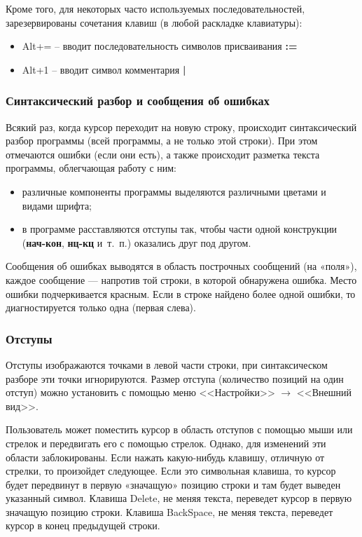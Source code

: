 Кроме того, для некоторых часто используемых последовательностей, зарезервированы сочетания клавиш (в любой раскладке клавиатуры):
\begin{itemize}
\item \textsf{Alt+=} -- вводит последовательность символов присваивания \textbf{\textsf{:=}}
\item \textsf{Alt+1} -- вводит символ комментария \textbf{\textsf{|}}
\end{itemize}
	
\subsubsection{Синтаксический разбор и сообщения об ошибках}

Всякий раз, когда курсор переходит на новую строку, происходит синтаксический разбор программы (всей программы, а не только этой строки). При этом отмечаются ошибки (если они есть), а также происходит разметка текста программы, облегчающая работу с ним:
\begin{itemize}
\item различные компоненты программы выделяются различными цветами и видами шрифта;
\item в программе расставляются отступы так, чтобы части одной конструкции (\textbf{\textsf{нач-кон}}, \textbf{\textsf{нц-кц}} и~т.~п.) оказались друг под другом.
\end{itemize}
	
Сообщения об ошибках выводятся в область построчных сообщений (на «поля»), каждое сообщение --- напротив той строки, в которой обнаружена ошибка. Место ошибки подчеркивается красным. Если в строке найдено более одной ошибки, то диагностируется только одна (первая слева).

\subsubsection{Отступы}

Отступы изображаются точками в левой части строки, при синтаксическом разборе эти точки игнорируются. Размер отступа (количество позиций на один отступ) можно установить с помощью меню <<Настройки>> $\to$ <<Внешний вид>>.

Пользователь может поместить курсор в область отступов с помощью мыши или стрелок и передвигать его с помощью стрелок. Однако, для изменений эти области заблокированы. Если нажать какую-нибудь клавишу, отличную от стрелки, то произойдет следующее. Если это символьная клавиша, то курсор будет передвинут в первую «значащую» позицию строки и там будет выведен указанный символ. Клавиша \textsf{Delete}, не меняя текста,  переведет курсор в первую значащую позицию строки. Клавиша \textsf{BackSpace}, не меняя текста,  переведет курсор в конец предыдущей строки.

